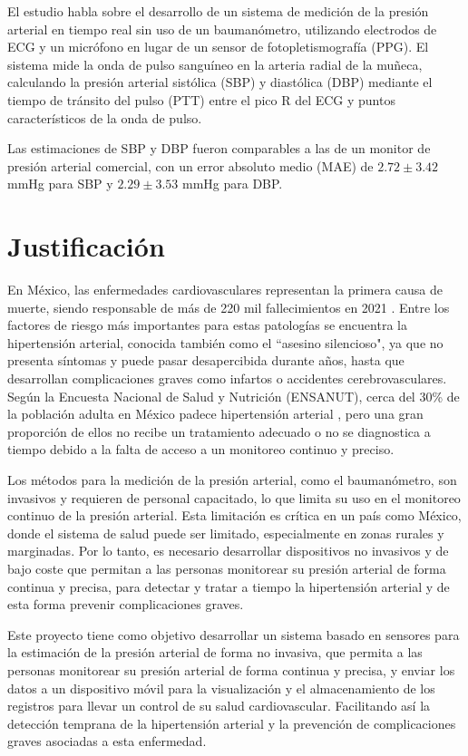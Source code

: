     El estudio habla sobre el desarrollo de un sistema de medición de la presión arterial en tiempo real sin uso de un baumanómetro, utilizando electrodos de ECG y un micrófono en lugar de un sensor de fotopletismografía (PPG). El sistema mide la onda de pulso sanguíneo en la arteria radial de la muñeca, calculando la presión arterial sistólica (SBP) y diastólica (DBP) mediante el tiempo de tránsito del pulso (PTT) entre el pico R del ECG y puntos característicos de la onda de pulso.
    
    Las estimaciones de SBP y DBP fueron comparables a las de un monitor de presión arterial comercial, con un error absoluto medio (MAE) de $2.72 \pm 3.42$ mmHg para SBP y $2.29 \pm 3.53$ mmHg para DBP.


\newpage
\section{Justificación}

En México, las enfermedades cardiovasculares representan la primera causa de muerte, siendo responsable de más de 220 mil fallecimientos en 2021 \cite{SSFallecimientos}. Entre los factores de riesgo más importantes para estas patologías se encuentra la hipertensión arterial, conocida también como el ``asesino silencioso", ya que no presenta síntomas y puede pasar desapercibida durante años, hasta que desarrollan complicaciones graves como infartos o accidentes cerebrovasculares. Según la Encuesta Nacional de Salud y Nutrición (ENSANUT), cerca del 30\% de la población adulta en México padece hipertensión arterial \cite{ENSANUT}, pero una gran proporción de ellos no recibe un tratamiento adecuado o no se diagnostica a tiempo debido a la falta de acceso a un monitoreo continuo y preciso.

Los métodos para la medición de la presión arterial, como el baumanómetro, son invasivos y requieren de personal capacitado, lo que limita su uso en el monitoreo continuo de la presión arterial. Esta limitación es crítica en un país como México, donde el sistema de salud puede ser limitado, especialmente en zonas rurales y marginadas. Por lo tanto, es necesario desarrollar dispositivos no invasivos y de bajo coste que permitan a las personas monitorear su presión arterial de forma continua y precisa, para detectar y tratar a tiempo la hipertensión arterial y de esta forma prevenir complicaciones graves.

Este proyecto tiene como objetivo desarrollar un sistema basado en sensores para la estimación de la presión arterial de forma no invasiva, que permita a las personas monitorear su presión arterial de forma continua y precisa, y enviar los datos a un dispositivo móvil para la visualización y el almacenamiento de los registros para llevar un control de su salud cardiovascular. Facilitando así la detección temprana de la hipertensión arterial y la prevención de complicaciones graves asociadas a esta enfermedad.

